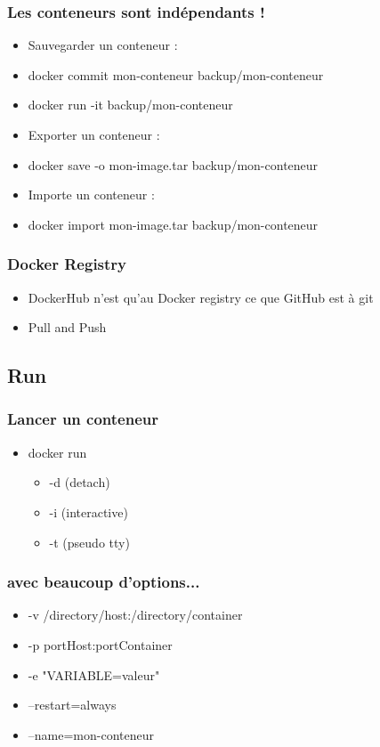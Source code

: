   \begin{frame}
    \frametitle{Les conteneurs sont indépendants !}
    \begin{itemize}
      \item Sauvegarder un conteneur :
      \item docker commit mon-conteneur backup/mon-conteneur
      \item docker run -it backup/mon-conteneur
      \item Exporter un conteneur :
      \item docker save -o mon-image.tar backup/mon-conteneur
      \item Importe un conteneur :
      \item docker import mon-image.tar backup/mon-conteneur
    \end{itemize}
  \end{frame}

  \begin{frame}
    \frametitle{Docker Registry}
    \begin{itemize}
      \item DockerHub n'est qu'au Docker registry ce que GitHub est à git
      \item Pull and Push
    \end{itemize}
  \end{frame}

  \subsection[Docker]{Run}

  \begin{frame}
    \frametitle{Lancer un conteneur}
    \begin{itemize}
      \item docker run
        \begin{itemize}
          \item -d (detach)
          \item -i (interactive)
          \item -t (pseudo tty)
        \end{itemize}
    \end{itemize}
  \end{frame}

  \begin{frame}
    \frametitle{avec beaucoup d'options...}
    \begin{itemize}
      \item -v /directory/host:/directory/container
      \item -p portHost:portContainer
      \item -e "VARIABLE=valeur"
      \item --restart=always
      \item --name=mon-conteneur
    \end{itemize}
  \end{frame}

